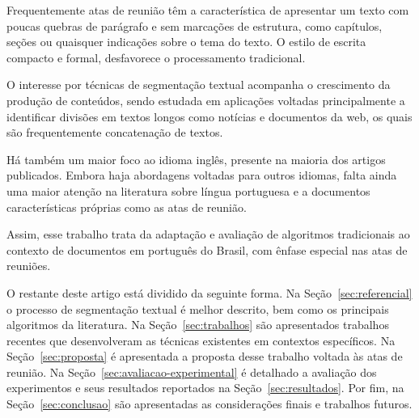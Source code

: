 Frequentemente atas de reunião têm a característica de apresentar um texto com poucas quebras de parágrafo e sem marcações de estrutura, como capítulos, seções ou quaisquer indicações sobre o tema do texto. O estilo de escrita compacto e formal, desfavorece o processamento tradicional.

O interesse por técnicas de segmentação textual acompanha o crescimento da produção de conteúdos, sendo estudada em aplicações voltadas principalmente a identificar divisões em
textos longos como notícias e documentos da web, os quais são frequentemente concatenação de textos. 


Há também um maior foco ao idioma inglês, presente na maioria dos artigos publicados. Embora haja abordagens voltadas para outros idiomas, falta ainda uma maior atenção na literatura sobre língua portuguesa e a documentos características próprias como as atas de reunião.

Assim, esse trabalho trata da adaptação e avaliação de algoritmos tradicionais ao contexto de documentos em português do Brasil, com ênfase especial nas atas de reuniões.

O restante deste artigo está dividido da seguinte forma. Na Seção~\ref{sec:referencial} o processo de segmentação textual é melhor descrito, bem como os principais algoritmos da literatura. Na Seção~\ref{sec:trabalhos} são apresentados trabalhos recentes que desenvolveram as técnicas existentes em contextos específicos. Na Seção~\ref{sec:proposta} é apresentada a proposta desse trabalho voltada às atas de reunião. Na Seção~\ref{sec:avaliacao-experimental} é detalhado a avaliação dos experimentos e seus resultados reportados na Seção~\ref{sec:resultados}. Por fim, na Seção~\ref{sec:conclusao} são apresentadas as considerações finais e trabalhos futuros.










